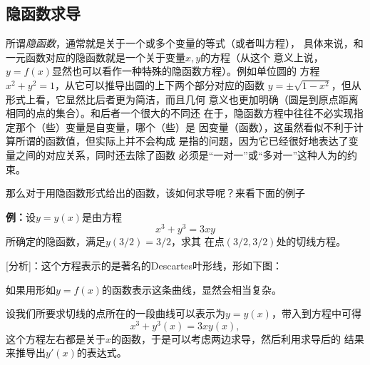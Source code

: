 \subsection{隐函数求导}

所谓{\it 隐函数}，通常就是关于一个或多个变量的等式（或者叫方程），
具体来说，和一元函数对应的隐函数就是一个关于变量$x,y$的方程（从这个
意义上说，$y=f(x)$显然也可以看作一种特殊的隐函数方程）。例如单位圆的
方程$x^2+y^2=1$，从它可以推导出圆的上下两个部分对应的函数
$y=\pm\sqrt{1-x^2}$，但从形式上看，它显然比后者更为简洁，而且几何
意义也更加明确（圆是到原点距离相同的点的集合）。和后者一个很大的不同还
在于，隐函数方程中往往不必实现指定那个（些）变量是自变量，哪个（些）是
因变量（函数），这虽然看似不利于计算所谓的函数值，但实际上并不会构成
是指的问题，因为它已经很好地表达了变量之间的对应关系，同时还去除了函数
必须是“一对一”或“多对一”这种人为的约束。

那么对于用隐函数形式给出的函数，该如何求导呢？来看下面的例子

{\bf 例：}设$y=y(x)$是由方程
$$x^3+y^3=3xy$$
所确定的隐函数，满足$y(3/2)=3/2$，求其
在点$(3/2,3/2)$处的切线方程。

[分析]：这个方程表示的是著名的{\kaishu Descartes叶形线}，形如下图：
\begin{center}
\end{center}
如果用形如$y=f(x)$的函数表示这条曲线，显然会相当复杂。

设我们所要求切线的点所在的一段曲线可以表示为$y=y(x)$，带入到方程中可得
$$x^3+y^3(x)=3xy(x),$$
这个方程左右都是关于$x$的函数，于是可以考虑两边求导，然后利用求导后的
结果来推导出$y'(x)$的表达式。

